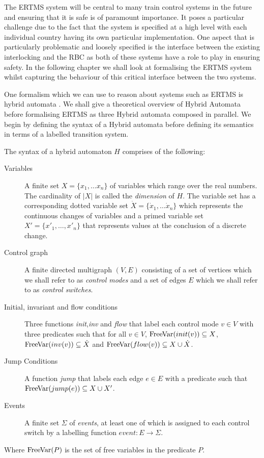 The ERTMS system will be central to many train control systems in the future and ensuring that it is safe is of paramount importance. It poses a particular challenge due to the fact that the system is specified at a high level with each individual country having its own particular implementation. One aspect that is particularly problematic and loosely specified is the interface between the existing interlocking and the RBC as both of these systems have a role to play in ensuring safety. In the following chapter we shall look at formalising the ERTMS system whilst capturing the behaviour of this critical interface between the two systems. 


One formalism which we can use to reason about systems such as ERTMS is hybrid automata \cite{TH96}. We shall give a theoretical overview of Hybrid Automata before formalising ERTMS as three Hybrid automata composed in parallel.
We begin by defining the syntax of a Hybrid automata before defining its semantics in terms of a labelled transition system.
\medskip
\begin{mydef}
The syntax of a hybrid automaton $H$ comprises of the following:
\begin{description}
\item[Variables] A finite set $X = \{x_1, \ldots x_n \}$ of variables which range over the real numbers. The cardinality of $|X|$ is called the \emph{dimension} of $H$. The variable set has a corresponding dotted variable set $\dot{X} = \{\dot{x}_1, \ldots \dot{x}_n \}$ which represents the continuous changes of variables and a primed variable set $X' = \{x'_1, \ldots , x'_n \}$ that represents  values at the conclusion of a discrete change.

\item[Control graph] A finite directed multigraph $(V,E)$ consisting of a set of vertices which we shall refer to as \emph{control modes} and a set of edges $E$ which we shall refer to as \emph{control switches}.

\item[Initial, invariant and flow conditions] Three functions \emph{init},\emph{inv} and \emph{flow} that label each control mode $v \in V$ with three predicates such that for all $v \in V$, $\mathrm{FreeVar}(init(v)) \subseteq X$, $\mathrm{FreeVar}(inv(v)) \subseteq \dot{X}$ and $\mathrm{FreeVar}(flow(v)) \subseteq X \cup \dot{X}$. 


\item[Jump Conditions] A function \emph{jump} that labels each edge $e \in E$ with a predicate such that $\mathrm{FreeVar}(jump(e)) \subseteq X \cup X' $.

\item[Events] A finite set $\Sigma$ of \emph{events}, at least one of which is assigned to  each control switch by a labelling function $event: E \to \Sigma$.

\end{description}
Where $\mathrm{FreeVar}(P)$ is the set of free variables in the predicate $P$.
\end{mydef}
